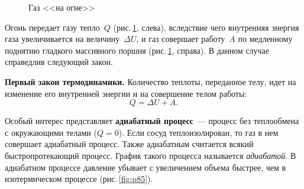 \documentclass[main.tex]{subfiles}
\begin{document}
\begin{figure}[H]
\caption{Газ <<на огне>>}
\label{fig:p84}
\end{figure}

Огонь передает газу тепло~$Q$ (рис.\,\ref{fig:p84}, слева), вследствие чего внутренняя энергия газа увеличивается на величину~$\Delta U$, и газ совершает работу~$A$ по медленному поднятию гладкого массивного поршня (рис.\,\ref{fig:p84}, справа). В данном случае справедлив следующий закон.
%
\begin{law}
\textbf{Первый закон термодинамики.} Количество теплоты, переданное телу, идет на изменение его внутренней энергии и на совершение телом работы:
\begin{equation}
    Q=\Delta U+A.
\end{equation}
\end{law}
%
Особый интерес представляет \textbf{адиабатный процесс}~--- процесс без теплообмена с окружающими телами ($Q = 0$). Если сосуд теплоизолирован, то газ в нем совершает адиабатный процесс. Также адиабатным считается всякий быстропротекающий процесс. График такого процесса называется \emph{адиабатой}. 
В адиабатном процессе давление убывает с увеличением объема быстрее, чем в изотермическом процессе (рис.\,\ref{fig:p85}).
\end{document}
